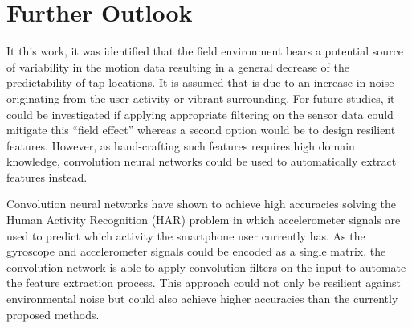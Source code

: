 \section{Further Outlook}
It this work, it was identified that the field environment bears a potential source of variability in the motion data resulting in a general decrease of the predictability of tap locations. It is assumed that is due to an increase in noise originating from the user activity or vibrant surrounding. For future studies, it could be investigated if applying appropriate filtering on the sensor data could mitigate this ``field effect'' whereas a second option would be to design resilient features. However, as hand-crafting such features requires high domain knowledge, convolution neural networks could be used to automatically extract features instead.

Convolution neural networks have shown to achieve high accuracies solving the Human Activity Recognition (HAR) problem \cite{zeng2014convolutional} in which accelerometer signals are used to predict which activity the smartphone user currently has. As the gyroscope and accelerometer signals could be encoded as a single matrix, the convolution network is able to apply convolution filters on the input to automate the feature extraction process. This approach could not only be resilient against environmental noise but could also achieve higher accuracies than the currently proposed methods.



